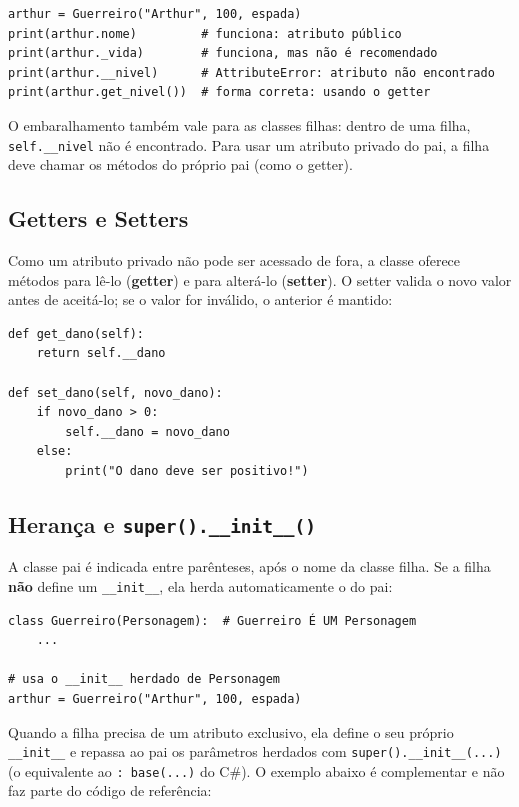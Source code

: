 \begin{lstlisting}[style=python]
arthur = Guerreiro("Arthur", 100, espada)
print(arthur.nome)         # funciona: atributo público
print(arthur._vida)        # funciona, mas não é recomendado
print(arthur.__nivel)      # AttributeError: atributo não encontrado
print(arthur.get_nivel())  # forma correta: usando o getter
\end{lstlisting}

O embaralhamento também vale para as classes filhas: dentro de uma filha, \texttt{self.\_\_nivel}
não é encontrado. Para usar um atributo privado do pai, a filha deve chamar os métodos do
próprio pai (como o getter).

\subsection{Getters e Setters}

Como um atributo privado não pode ser acessado de fora, a classe oferece métodos para lê-lo
(\textbf{getter}) e para alterá-lo (\textbf{setter}). O setter valida o novo valor antes de
aceitá-lo; se o valor for inválido, o anterior é mantido:

\begin{lstlisting}[style=python]
def get_dano(self):
    return self.__dano

def set_dano(self, novo_dano):
    if novo_dano > 0:
        self.__dano = novo_dano
    else:
        print("O dano deve ser positivo!")
\end{lstlisting}

\subsection{Herança e \texttt{super().\_\_init\_\_()}}

A classe pai é indicada entre parênteses, após o nome da classe filha. Se a filha
\textbf{não} define um \texttt{\_\_init\_\_}, ela herda automaticamente o do pai:

\begin{lstlisting}[style=python]
class Guerreiro(Personagem):  # Guerreiro É UM Personagem
    ...

# usa o __init__ herdado de Personagem
arthur = Guerreiro("Arthur", 100, espada)
\end{lstlisting}

Quando a filha precisa de um atributo exclusivo, ela define o seu próprio \texttt{\_\_init\_\_}
e repassa ao pai os parâmetros herdados com \texttt{super().\_\_init\_\_(...)} (o equivalente ao
\texttt{: base(...)} do C\#). O exemplo abaixo é complementar e não faz parte do código de
referência:

